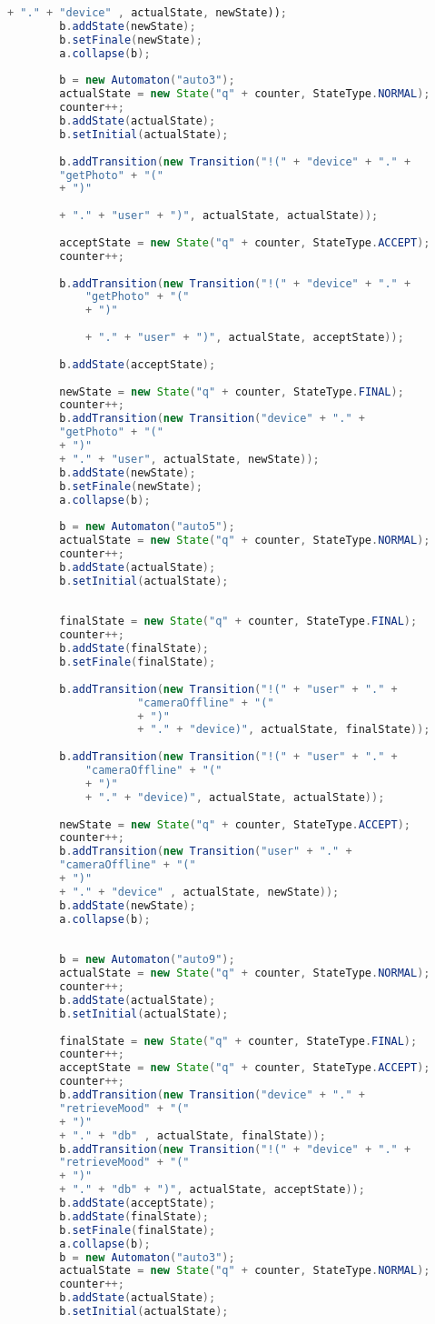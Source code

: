 \begin{lstlisting}[language=java, caption={Specification osztály.},captionpos=b]
		+ "." + "device" , actualState, newState));
		b.addState(newState);
		b.setFinale(newState);
		a.collapse(b);
		
		b = new Automaton("auto3");
		actualState = new State("q" + counter, StateType.NORMAL);
		counter++;
		b.addState(actualState);
		b.setInitial(actualState);
		
		b.addTransition(new Transition("!(" + "device" + "." +
		"getPhoto" + "("
		+ ")"
		
		+ "." + "user" + ")", actualState, actualState));
		
		acceptState = new State("q" + counter, StateType.ACCEPT);
		counter++;
		
		b.addTransition(new Transition("!(" + "device" + "." +
			"getPhoto" + "("
			+ ")"
			
			+ "." + "user" + ")", actualState, acceptState));
		
		b.addState(acceptState);
		
		newState = new State("q" + counter, StateType.FINAL);
		counter++;
		b.addTransition(new Transition("device" + "." +
		"getPhoto" + "("
		+ ")"
		+ "." + "user", actualState, newState));
		b.addState(newState);
		b.setFinale(newState);
		a.collapse(b);
		
		b = new Automaton("auto5");
		actualState = new State("q" + counter, StateType.NORMAL);
		counter++;
		b.addState(actualState);
		b.setInitial(actualState);
											
		
		finalState = new State("q" + counter, StateType.FINAL);
		counter++;
		b.addState(finalState);
		b.setFinale(finalState);
		
		b.addTransition(new Transition("!(" + "user" + "." +
					"cameraOffline" + "("
					+ ")"
					+ "." + "device)", actualState, finalState));
		
		b.addTransition(new Transition("!(" + "user" + "." +
			"cameraOffline" + "("
			+ ")"
			+ "." + "device)", actualState, actualState));
			
		newState = new State("q" + counter, StateType.ACCEPT);
		counter++;
		b.addTransition(new Transition("user" + "." +
		"cameraOffline" + "("
		+ ")"
		+ "." + "device" , actualState, newState));
		b.addState(newState);
		a.collapse(b);
		
		
		b = new Automaton("auto9");
		actualState = new State("q" + counter, StateType.NORMAL);
		counter++;
		b.addState(actualState);
		b.setInitial(actualState);
											
		finalState = new State("q" + counter, StateType.FINAL);
		counter++;
		acceptState = new State("q" + counter, StateType.ACCEPT);
		counter++;
		b.addTransition(new Transition("device" + "." +
		"retrieveMood" + "("
		+ ")"
		+ "." + "db" , actualState, finalState));
		b.addTransition(new Transition("!(" + "device" + "." +
		"retrieveMood" + "("
		+ ")"
		+ "." + "db" + ")", actualState, acceptState));
		b.addState(acceptState);
		b.addState(finalState);
		b.setFinale(finalState);
		a.collapse(b);
		b = new Automaton("auto3");
		actualState = new State("q" + counter, StateType.NORMAL);
		counter++;
		b.addState(actualState);
		b.setInitial(actualState);
		

\end{lstlisting}
